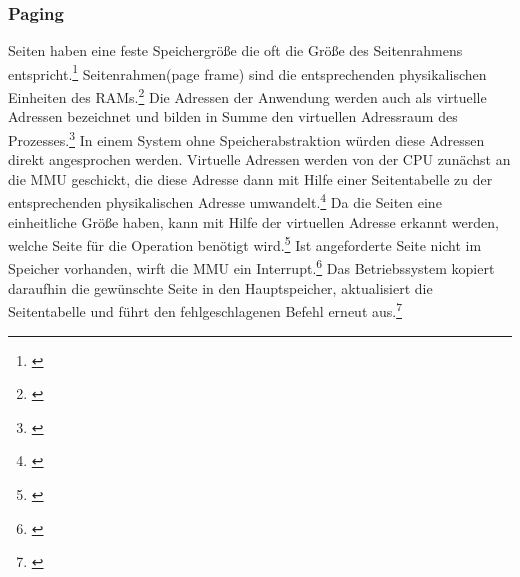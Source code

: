 \subsubsection{Paging}
Seiten haben eine feste Speichergröße die oft die Größe des Seitenrahmens entspricht.\footnote{\cite[S.~253]{Tanenbaum.2016}} Seitenrahmen(page frame) sind die entsprechenden physikalischen Einheiten des \ac{RAM}s.\footnote{\cite[S.~253]{Tanenbaum.2016}} Die Adressen der Anwendung werden auch als virtuelle Adressen bezeichnet und bilden in Summe den virtuellen Adressraum des Prozesses.\footnote{\cite[S.~253]{Tanenbaum.2016}} In einem System ohne Speicherabstraktion würden diese Adressen direkt angesprochen werden. Virtuelle Adressen werden von der \ac{CPU} zunächst an die \ac{MMU} geschickt, die diese Adresse dann mit Hilfe einer Seitentabelle zu der entsprechenden physikalischen Adresse umwandelt.\footnote{\cite[S.~253]{Tanenbaum.2016}} Da die Seiten eine einheitliche Größe haben, kann mit Hilfe der virtuellen Adresse erkannt werden, welche Seite für die Operation benötigt wird.\footnote{\cite[S.~253]{Tanenbaum.2016}} Ist angeforderte Seite nicht im Speicher vorhanden, wirft die \ac{MMU} ein Interrupt.\footnote{\cite[S.~254--255]{Tanenbaum.2016}} Das Betriebssystem kopiert daraufhin die gewünschte Seite in den Hauptspeicher, aktualisiert die Seitentabelle und führt den fehlgeschlagenen Befehl erneut aus.\footnote{\cite[S.~254--255]{Tanenbaum.2016}}


